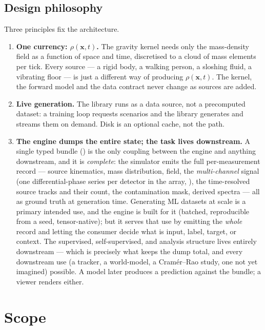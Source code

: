\documentclass[11pt,a4paper]{article}
\theoremstyle{reqstyle}
\newcommand{\xv}{\mathbf{x}}
\begin{document}
\subsection{Design philosophy}
Three principles fix the architecture.

\begin{enumerate}[leftmargin=*]
\item \textbf{One currency: $\rho(\xv,t)$.} The gravity kernel needs only the mass-density
field as a function of space and time, discretised to a cloud of mass elements per tick.
Every source --- a rigid body, a walking person, a sloshing fluid, a vibrating floor --- is
just a different way of producing $\rho(\xv,t)$. The kernel, the forward model and the data
contract never change as sources are added.

\item \textbf{Live generation.} The library runs as a data source, not a precomputed
dataset: a training loop requests scenarios and the library generates and streams them on
demand. Disk is an optional cache, not the path.

\item \textbf{The engine dumps the entire state; the task lives downstream.} A single typed
bundle () is the only coupling between the engine and anything downstream, and
it is \emph{complete}: the simulator emits the full per-measurement record --- source kinematics,
mass distribution, field, the \emph{multi-channel} signal (one differential-phase series per
detector in the array, ), the time-resolved source tracks and their count, the
contamination mask, derived spectra --- all as ground truth at generation time. Generating ML
datasets at scale is a primary intended use, and the engine is built for it (batched, reproducible
from a seed, tensor-native); but it serves that use by emitting the \emph{whole} record and letting
the consumer decide what is input, label, target, or context. The supervised, self-supervised, and
analysis structure lives entirely downstream --- which is precisely what keeps the dump total, and
every downstream use (a tracker, a world-model, a Cram\'er--Rao study, one not yet imagined)
possible. A model later produces a prediction against the bundle; a viewer renders either.
\end{enumerate}

\section{Scope}
\label{sec:scope}
\end{document}
